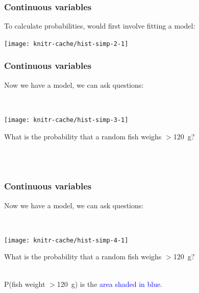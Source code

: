 \begin{frame}
\frametitle{Continuous variables}

To calculate probabilities, would first involve fitting a model:

\begin{knitrout}
\color{fgcolor}
\texttt{[image: knitr-cache/hist-simp-2-1]}

\end{knitrout}

\end{frame}


\begin{frame}
\frametitle{Continuous variables}

Now we have a model, we can ask questions:

~\\

\begin{knitrout}
\color{fgcolor}
\texttt{[image: knitr-cache/hist-simp-3-1]}

\end{knitrout}

What is the probability that a random fish weighs $>$120~g?

~\\

~\\

\end{frame}



\begin{frame}
\frametitle{Continuous variables}

Now we have a model, we can ask questions:

~\\

\begin{knitrout}
\color{fgcolor}
\texttt{[image: knitr-cache/hist-simp-4-1]}

\end{knitrout}

What is the probability that a random fish weighs $>$120~g?

~\\

P(fish weight $>$120~g) is the \textcolor{blue}{area shaded in blue}.


\end{frame}


